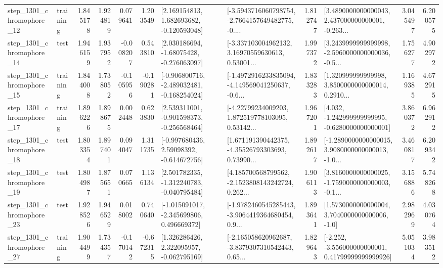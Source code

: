 \begin{tabular}{llrrrrllrlrr}
 step\_1301\_chromophore\_12 &  training &      1.845178 &    1.924819 &      0.079641 &  1.203549 &    [2.169154813, 1.682693682, -0.120593048] &  [-3.5943716060798754, -2.7664157649482775, -0.... &       1.812747 &  [3.4890000000000043, 2.437000000000001, -0.263... &            3.045497 &          6.200575 \\
 step\_1301\_chromophore\_14 &      test &      1.946159 &    1.937952 &     -0.008207 &  0.543810 &    [2.030186694, -1.68075428, -0.276063097] &  [-3.337103004962132, 3.16970559630613, 0.53001... &       1.997372 &  [3.2439999999999998, -2.5960000000000036, -0.5... &            1.756277 &          4.902972 \\
 step\_1301\_chromophore\_15 &  training &      1.844008 &    1.738052 &     -0.105956 & -0.190281 &  [-0.906800716, -2.489032481, -0.168254024] &  [-1.4972916233835094, -4.149569041250637, -0.6... &       1.833283 &  [1.320999999999998, 3.8500000000000014, 0.2910... &            1.169385 &          4.672915 \\
 step\_1301\_chromophore\_17 &  training &      1.896226 &    1.898675 &      0.002448 &  0.623830 &   [2.539311001, -0.901598373, -0.256568464] &  [-4.22799234009203, 1.872519778103095, 0.53142... &       1.967201 &   [4.032, -1.242999999999995, -0.6280000000000001] &            3.860372 &          6.962912 \\
 step\_1301\_chromophore\_18 &      test &      1.803354 &    1.897401 &      0.094047 &  1.311735 &    [-0.997680436, 2.59098392, -0.614672756] &  [1.671191390442375, -4.35526793303693, 0.73990... &       1.892617 &  [-1.2890000000000015, 3.9080000000000013, -1.0... &            3.460817 &          6.209342 \\
 step\_1301\_chromophore\_19 &      test &      1.804987 &    1.875651 &      0.070665 &  1.136134 &   [2.501782335, -1.312240783, -0.040795484] &  [4.185700568799562, -2.1523808143242724, 0.262... &       1.906113 &  [3.8160000000000025, -1.7590000000000003, -0.1... &            3.156886 &          5.748268 \\
 step\_1301\_chromophore\_23 &      test &      1.928526 &    1.946529 &      0.018002 &  0.740640 &   [-1.015091017, -2.345699806, 0.496669372] &  [-1.9782460545285443, -3.9064419364680454, 0.9... &       1.893641 &     [1.5730000000000004, 3.7040000000000006, -1.0] &            2.982969 &          4.030764 \\
 step\_1301\_chromophore\_27 &  training &      1.904499 &    1.734357 &     -0.170142 & -0.672315 &    [1.326286426, 2.322095957, -0.062795169] &  [-2.165058620962687, -3.8379307310542443, 0.65... &       1.829643 &  [-2.252, -3.556000000000001, 0.41799999999999926] &            5.051034 &          3.983512 \\

\end{tabular}
